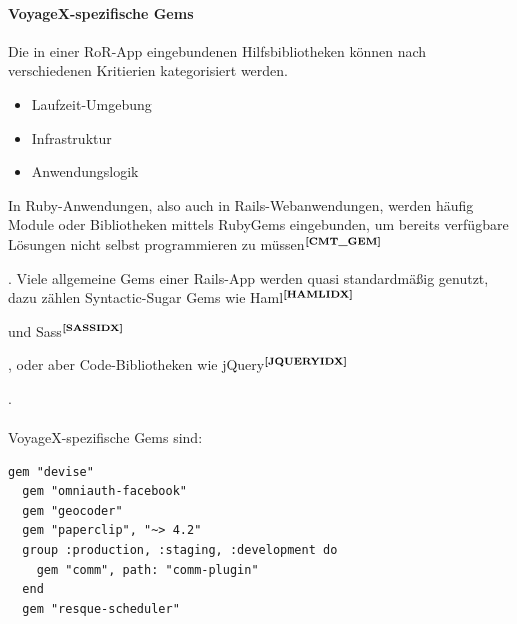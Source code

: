 \paragraph{VoyageX-spezifische Gems}\noindent
Die in einer RoR-App eingebundenen Hilfsbibliotheken können nach verschiedenen Kritierien kategorisiert werden.
	\begin{itemize}
		\item Laufzeit-Umgebung
		\item Infrastruktur
		\item Anwendungslogik
	\end{itemize}
In Ruby-Anwendungen, also auch in Rails-Webanwendungen, werden häufig Module oder Bibliotheken mittels RubyGems eingebunden, um bereits verfügbare Lösungen nicht selbst programmieren zu müssen$^{\textbf{\ref{CMT_GEM}}}$%
\addtocounter{footnote}{1}%
. Viele allgemeine Gems einer Rails-App werden quasi standardmäßig genutzt, dazu zählen Syntactic-Sugar Gems wie Haml$^{\textbf{\ref{HAMLIDX}}}$%
\addtocounter{footnote}{1}%
und Sass$^{\textbf{\ref{SASSIDX}}}$%
\addtocounter{footnote}{1}%
, oder aber Code-Bibliotheken wie jQuery$^{\textbf{\ref{JQUERYIDX}}}$%
\addtocounter{footnote}{1}%
.\\ \\
VoyageX-spezifische Gems sind:\\
\lstset{language=CoffeeScript}
\begin{lstlisting}[frame=single,xleftmargin=0pt,numbers=none]
  gem "devise"
  gem "omniauth-facebook"
  gem "geocoder"
  gem "paperclip", "~> 4.2"
  group :production, :staging, :development do
    gem "comm", path: "comm-plugin"
  end
  gem "resque-scheduler" 
\end{lstlisting}

